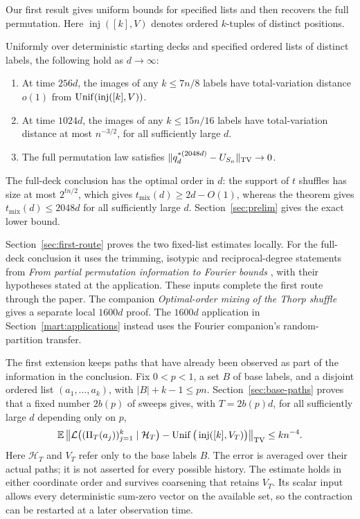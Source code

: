Our first result gives uniform bounds for specified lists and then
recovers the full permutation. Here $\operatorname{inj}([k],V)$
denotes ordered $k$-tuples of distinct positions.

\begin{theorem}\label{thm:first-main}
Uniformly over deterministic starting decks and specified ordered lists
of distinct labels, the following hold as $d\to\infty$:
\begin{enumerate}
\item At time $256d$, the images of any $k\le7n/8$ labels have
total-variation distance $o(1)$ from
$\operatorname{Unif}(\operatorname{inj}([k],V))$.
\item At time $1024d$, the images of any $k\le15n/16$ labels have
total-variation distance at most $n^{-3/2}$, for all sufficiently
large $d$.
\item The full permutation law satisfies
$\|q_d^{*(2048d)}-U_{S_n}\|_{\mathrm{TV}}\to0$.
\end{enumerate}
\end{theorem}

The full-deck conclusion has the optimal order in $d$: the support
of $t$ shuffles has size at most $2^{tn/2}$, which gives
$t_{\mathrm{mix}}(d)\ge2d-O(1)$, whereas the theorem gives
$t_{\mathrm{mix}}(d)\le2048d$ for all sufficiently large $d$.
Section~\ref{sec:prelim} gives the exact lower bound.

Section~\ref{sec:first-route} proves the two fixed-list estimates locally.
For the full-deck conclusion it uses the trimming, isotypic
and reciprocal-degree statements from
\emph{From partial permutation information to Fourier bounds}
\cite{partialFourier}, with their hypotheses stated at the application.
These inputs complete the first route through the paper. The companion
\emph{Optimal-order mixing of the Thorp shuffle}~\cite{optimalThorp}
gives a separate local $1600d$ proof. The $1600d$ application in
Section~\ref{mart:applications} instead uses the Fourier companion's
random-partition transfer.

The first extension keeps paths that have already been observed as
part of the information in the conclusion. Fix $0<p<1$, a set $B$ of
base labels, and a disjoint ordered list $(a_1,\ldots,a_k)$, with
$|B|+k-1\le pn$. Section~\ref{sec:base-paths} proves that a fixed
number $2b(p)$ of sweeps gives, with $T=2b(p)d$, for all sufficiently
large $d$ depending only on $p$,
\[
 \mathbb E\left\|
 \mathcal L\big((\Pi_T(a_j))_{j=1}^k\mid\mathcal H_T\big)
 -\operatorname{Unif}\big(\operatorname{inj}([k],V_T)\big)
 \right\|_{\mathrm{TV}}\le kn^{-4}.
\]
Here $\mathcal H_T$ and $V_T$ refer only to the base labels $B$.
The error is averaged over their actual paths; it is not asserted
for every possible history. The estimate holds in either coordinate
order and survives coarsening that retains $V_T$. Its scalar input
allows every deterministic sum-zero vector on the available set, so
the contraction can be restarted at a later observation time.

